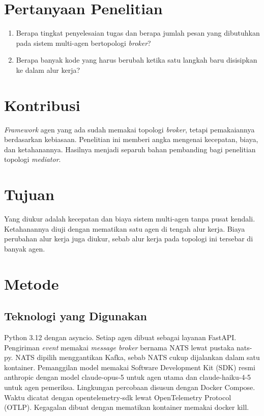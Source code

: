 \documentclass[11pt,a4paper]{article}
\begin{document}
\section{Pertanyaan Penelitian}

\begin{enumerate}[label=\textbf{Pertanyaan \arabic*.}, leftmargin=*, labelsep=0.5em]
  \item Berapa tingkat penyelesaian tugas dan berapa jumlah pesan yang dibutuhkan pada sistem multi-agen bertopologi \textit{broker}?
  \item Berapa banyak kode yang harus berubah ketika satu langkah baru disisipkan ke dalam alur kerja?
\end{enumerate}

\section{Kontribusi}

\textit{Framework} agen yang ada sudah memakai topologi \textit{broker}, tetapi pemakaiannya berdasarkan kebiasaan. Penelitian ini memberi angka mengenai kecepatan, biaya, dan ketahanannya. Hasilnya menjadi separuh bahan pembanding bagi penelitian topologi \textit{mediator}.

\section{Tujuan}

Yang diukur adalah kecepatan dan biaya sistem multi-agen tanpa pusat kendali. Ketahanannya diuji dengan mematikan satu agen di tengah alur kerja. Biaya perubahan alur kerja juga diukur, sebab alur kerja pada topologi ini tersebar di banyak agen.

\section{Metode}

\subsection{Teknologi yang Digunakan}

Python 3.12 dengan asyncio. Setiap agen dibuat sebagai layanan FastAPI. Pengiriman \textit{event} memakai \textit{message broker} bernama NATS lewat pustaka nats-py. NATS dipilih menggantikan Kafka, sebab NATS cukup dijalankan dalam satu kontainer. Pemanggilan model memakai Software Development Kit (SDK) resmi anthropic dengan model claude-opus-5 untuk agen utama dan claude-haiku-4-5 untuk agen pemeriksa. Lingkungan percobaan disusun dengan Docker Compose. Waktu dicatat dengan opentelemetry-sdk lewat OpenTelemetry Protocol (OTLP). Kegagalan dibuat dengan mematikan kontainer memakai docker kill.
\end{document}
